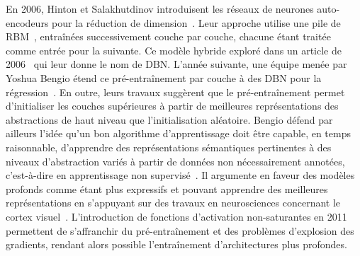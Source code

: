 En 2006, Hinton et Salakhutdinov introduisent les réseaux de neurones auto-encodeurs pour la réduction de dimension~\cite{hinton_reducing_2006}. Leur approche utilise une pile de \gls{RBM}~\cite{ackley_learning_1985,salakhutdinov_deep_2009}, entraînées successivement couche par couche, chacune étant traitée comme entrée pour la suivante. Ce modèle hybride exploré dans un article de 2006~\cite{hinton_fast_2006} qui leur donne le nom de \gls{DBN}. L'année suivante, une équipe menée par Yoshua Bengio étend ce pré-entraînement par couche à des \gls{DBN} pour la régression~\cite{bengio_greedy_2007}. En outre, leurs travaux suggèrent que le pré-entraînement permet d'initialiser les couches supérieures à partir de meilleures représentations des abstractions de haut niveau que l'initialisation aléatoire. Bengio défend par ailleurs l'idée qu'un bon algorithme d'apprentissage doit être capable, en temps raisonnable, d'apprendre des représentations sémantiques pertinentes à des niveaux d'abstraction variés à partir de données non nécessairement annotées, c'est-à-dire en apprentissage non supervisé~\cite{bengio_learning_2009}. Il argumente en faveur des modèles profonds comme étant plus expressifs et pouvant apprendre des meilleures représentations en s'appuyant sur des travaux en neurosciences concernant le cortex visuel~\cite{serre_quantitative_2007}. L'introduction de fonctions d'activation non-saturantes en 2011~\cite{glorot_deep_2011} permettent de s'affranchir du pré-entraînement et des problèmes d'explosion des gradients, rendant alors possible l'entraînement d'architectures plus profondes.


